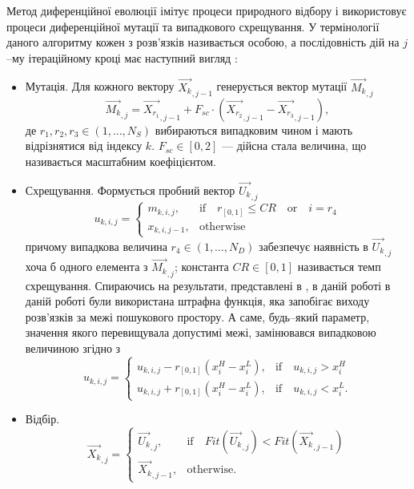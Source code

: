 Метод диференційної еволюції імітує процеси природного відбору і використовує процеси диференційної мутації та випадкового схрещування.
У термінології даного алгоритму кожен з розв'язків називається особою, а послідовність дій на $j$--му ітераційному кроці має наступний вигляд \cite{DEWang,DEModif}:
\begin{itemize}
  \item Мутація. Для кожного вектору $\overrightarrow{X_{k}}_{,j-1}$ генерується вектор мутації $\overrightarrow{M_{k}}_{,j}$
  \begin{equation}
 \label{eqDEMut}
 \overrightarrow{M_{k}}_{,j}=\overrightarrow{X_{r_1}}_{,j-1}+F_{sc}\cdot\left(\overrightarrow{X_{r_2}}_{,j-1}-\overrightarrow{X_{r_3}}_{,j-1}\right),
 \end{equation}
 де $r_1,r_2,r_3\in(1,\ldots,N_S)$ вибираються випадковим чином і мають відрізнятися від індексу $k$.
 $F_{sc}\in[0,2]$  --- дійсна стала величина, що називається масштабним коефіцієнтом.


  \item Схрещування. Формується пробний вектор $\overrightarrow{U_{k}}_{,j}$
  \begin{equation}
 \label{eqDECros}
 u_{k,i,j}=\left\{
 \begin{array}{ll}
 m_{k,i,j},& \text{if} \quad r_{[0,1]}\leq C\!R \quad \text{or} \quad i=r_{4}\\
 x_{k,i,j-1},& \text{otherwise}
 \end{array}
 \right.
 \end{equation}
 причому випадкова величина $r_4\in(1,\ldots,N_D)$
забезпечує наявність в $\overrightarrow{U_{k}}_{,j}$ хоча б одного елемента з $\overrightarrow{M_{k}}_{,j}$;
 константа $C\!R\in[0,1]$ називається темп схрещування.
  Спираючись на результати, представлені в \cite{P-DE_Ishaque},
  в даній роботі в даній роботі були використана штрафна функція, яка запобігає виходу розв'язків за межі пошукового простору.
  А саме, будь--який параметр, значення якого перевищувала допустимі межі, замінювався випадковою величиною згідно з
    \begin{equation}
 \label{eqDEPen}
 u_{k,i,j}=\left\{
 \begin{array}{ll}
 u_{k,i,j}-r_{[0,1]}(x_i^H-x_i^L),& \text{if} \quad u_{k,i,j}>x_i^H\\
 u_{k,i,j}+r_{[0,1]}(x_i^H-x_i^L),& \text{if} \quad u_{k,i,j}<x_i^L.
 \end{array}
 \right.
 \end{equation}
  \item Відбір.
      \begin{equation}
 \label{eqDESel}
 \overrightarrow{X_{k}}_{,j}=\left\{
 \begin{array}{ll}
\overrightarrow{U_{k}}_{,j},& \text{if} \quad Fit(\overrightarrow{U_k}_{,j})<Fit(\overrightarrow{X_k}_{,j-1})\\
 \overrightarrow{X_{k}}_{,j-1},& \text{otherwise}.
 \end{array}
 \right.
 \end{equation}

\end{itemize}
